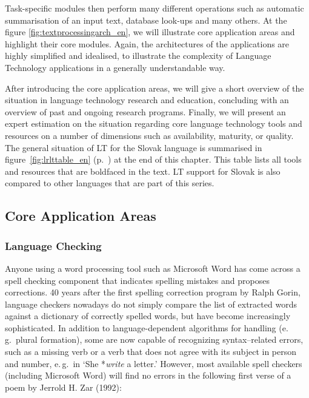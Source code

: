\begin{multicols}{2}
Task-specific modules then perform many different operations such as
automatic summarisation of an input text, database look-ups and many
others. At the figure \ref{fig:textprocessingarch_en}, we will
illustrate core application areas and highlight their core modules.
Again, the architectures of the applications are highly simplified and
idealised, to illustrate the complexity of Language Technology
applications in a generally understandable way.

After introducing the core application areas, we will give a short
overview of the situation in language technology research and education,
concluding with an overview of past and ongoing research programs.
Finally, we will present an expert estimation on the
situation regarding core language technology tools and resources on a
number of dimensions such as availability, maturity, or quality. The general situation of LT for the Slovak language is summarised in figure~\ref{fig:lrlttable_en} (p.~\pageref{fig:lrlttable_en}) at the end of this chapter. This table lists all tools and resources that are boldfaced in the text. LT support for Slovak is also compared to other languages that are part of this series.


\subsection{Core Application Areas}
\subsubsection{Language Checking}
Anyone using a word processing tool such as Microsoft Word has come across a spell checking component that indicates spelling mistakes and proposes corrections. 40 years after the first spelling correction program by Ralph Gorin, language checkers nowadays do not simply compare the list of extracted words against a dictionary of correctly spelled words, but have become increasingly sophisticated. In addition to language-dependent algorithms for handling  (e.\,g.~plural formation), some are now capable of recognizing syntax–related errors, such as a missing verb or a verb that does not agree with its subject in person and number, e.\,g.~in ‘She *\emph{write} a letter.’ However, most available spell checkers (including Microsoft Word) will find no errors in the following first verse of a poem by Jerrold H. Zar (1992)\cite{f22}: 


\end{multicols}
